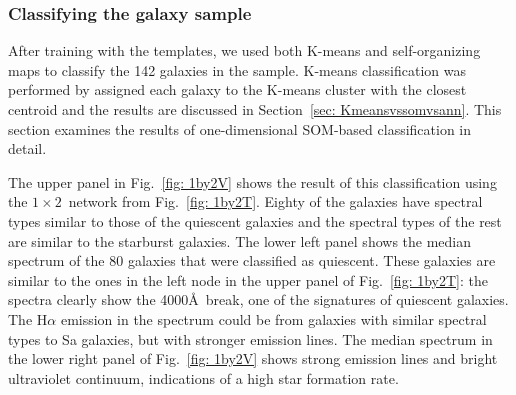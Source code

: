         \subsubsection{Classifying the galaxy sample}
         \label{sec: 1Dv}
         
         After training with the templates, we used both K-means and self-organizing maps to classify the 142 galaxies in the  sample.
         K-means classification was performed by assigned each galaxy to the K-means cluster with the closest centroid and the results are discussed in Section~\ref{sec: Kmeansvssomvsann}.
        This section examines the results of one-dimensional SOM-based classification in detail.
         
         
            
            The upper panel in Fig.~\ref{fig: 1by2V} shows the result of this classification using the $1\times2$~network from Fig.~\ref{fig: 1by2T}.
            Eighty of the galaxies have spectral types similar to those of the quiescent galaxies and the spectral types of the rest are similar to the starburst galaxies.
            The lower left panel shows the median spectrum of the 80 galaxies that were classified as quiescent. 
            These galaxies are similar to the ones in the left node in the upper panel of Fig.~\ref{fig: 1by2T}:
            the spectra clearly show the 4000\AA~break, one of the signatures of quiescent galaxies.
            The H$\alpha$ emission in the spectrum could be from galaxies with similar spectral types to Sa galaxies, but with stronger emission lines.
            The median spectrum in the lower right panel of Fig.~\ref{fig: 1by2V} shows strong emission lines and bright ultraviolet continuum, indications of a high star formation rate.
